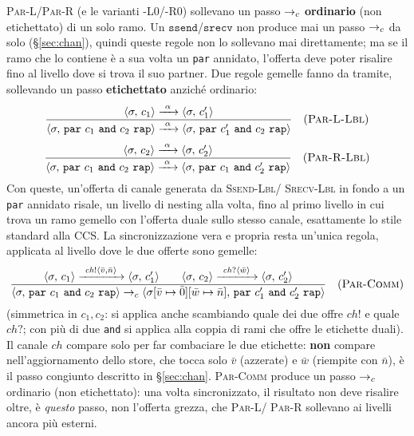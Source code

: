 \medskip
\noindent
\textsc{Par-L}/\textsc{Par-R} (e le varianti \textsc{-L0}/\textsc{-R0})
sollevano un passo $\to_c$ \textbf{ordinario} (non etichettato) di un solo
ramo. Un $\mathtt{ssend}$/$\mathtt{srecv}$ non produce mai un passo $\to_c$ da
solo (\S\ref{sec:chan}), quindi queste regole non lo sollevano mai
direttamente; ma se il ramo che lo contiene è a sua volta un \texttt{par}
annidato, l'offerta deve poter risalire fino al livello dove si trova il suo
partner. Due regole gemelle fanno da tramite, sollevando un passo
\textbf{etichettato} anziché ordinario:
\[
\dfrac{\cfg{c_1}{\sigma} \xrightarrow{\ \alpha\ } \cfg{c_1'}{\sigma}}
      {\cfg{\mathtt{par}\ c_1\ \mathtt{and}\ c_2\ \mathtt{rap}}{\sigma}
       \xrightarrow{\ \alpha\ } \cfg{\mathtt{par}\ c_1'\ \mathtt{and}\ c_2\ \mathtt{rap}}{\sigma}} \rname{Par-L-Lbl}
\]
\[
\dfrac{\cfg{c_2}{\sigma} \xrightarrow{\ \alpha\ } \cfg{c_2'}{\sigma}}
      {\cfg{\mathtt{par}\ c_1\ \mathtt{and}\ c_2\ \mathtt{rap}}{\sigma}
       \xrightarrow{\ \alpha\ } \cfg{\mathtt{par}\ c_1\ \mathtt{and}\ c_2'\ \mathtt{rap}}{\sigma}} \rname{Par-R-Lbl}
\]
Con queste, un'offerta di canale generata da \textsc{Ssend-Lbl}/
\textsc{Srecv-Lbl} in fondo a un \texttt{par} annidato risale, un livello di
nesting alla volta, fino al primo livello in cui trova un ramo gemello con
l'offerta duale sullo stesso canale, esattamente lo stile standard alla
CCS. La sincronizzazione vera e propria resta un'unica regola, applicata al
livello dove le due offerte sono gemelle:
\[
\dfrac{\cfg{c_1}{\sigma} \xrightarrow{\ \mathit{ch}!\langle \bar v,\bar n\rangle\ } \cfg{c_1'}{\sigma}
       \qquad
       \cfg{c_2}{\sigma} \xrightarrow{\ \mathit{ch}?\langle \bar w\rangle\ } \cfg{c_2'}{\sigma}}
      {\cfg{\mathtt{par}\ c_1\ \mathtt{and}\ c_2\ \mathtt{rap}}{\sigma} \toc
       \cfg{\mathtt{par}\ c_1'\ \mathtt{and}\ c_2'\ \mathtt{rap}}{\upd{\upd{\sigma}{\bar v}{\bar 0}}{\bar w}{\bar n}}}
      \rname{Par-Comm}
\]
(simmetrica in $c_1,c_2$: si applica anche scambiando quale dei due offre
$\mathit{ch}!$ e quale $\mathit{ch}?$; con più di due \texttt{and} si applica
alla coppia di rami che offre le etichette duali). Il canale $\mathit{ch}$
compare solo per far combaciare le due etichette: \textbf{non} compare
nell'aggiornamento dello store, che tocca solo $\bar v$ (azzerate) e $\bar w$
(riempite con $\bar n$), è il passo congiunto descritto in
\S\ref{sec:chan}. \textsc{Par-Comm} produce un passo $\to_c$ ordinario (non
etichettato): una volta sincronizzato, il risultato non deve risalire
oltre, è \emph{questo} passo, non l'offerta grezza, che \textsc{Par-L}/
\textsc{Par-R} sollevano ai livelli ancora più esterni.

